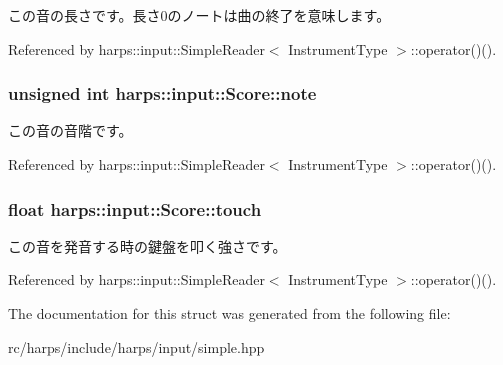 この音の長さです。長さ0のノートは曲の終了を意味します。 

Referenced by harps::input::SimpleReader$<$ InstrumentType $>$::operator()().
\subsubsection[note]{\setlength{\rightskip}{0pt plus 5cm}unsigned int {\bf harps::input::Score::note}}\label{structharps_1_1input_1_1Score_b73ecfe496a3e90669081a968044b78c}


この音の音階です。 

Referenced by harps::input::SimpleReader$<$ InstrumentType $>$::operator()().
\subsubsection[touch]{\setlength{\rightskip}{0pt plus 5cm}float {\bf harps::input::Score::touch}}\label{structharps_1_1input_1_1Score_49d93f1ba67f1504e5d87e5658a6aad3}


この音を発音する時の鍵盤を叩く強さです。 

Referenced by harps::input::SimpleReader$<$ InstrumentType $>$::operator()().

The documentation for this struct was generated from the following file:\begin{CompactItemize}
\item 
rc/harps/include/harps/input/simple.hpp\end{CompactItemize}

